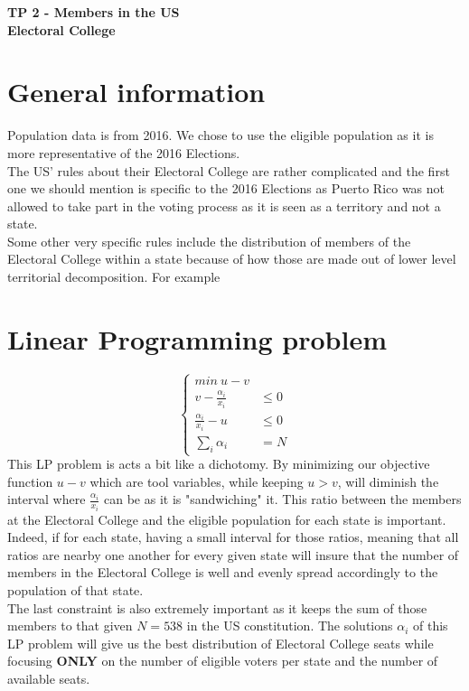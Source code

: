 \documentclass[a4paper,10pt,calibri,oneside,openany, twocolumn]{report}
\theoremstyle{break}
\begin{document}
	\begin{center}
		\bfseries TP 2 - Members in the US\\ Electoral College
	\end{center}
\section*{General information}
Population data is from 2016. We chose to use the eligible population as it is more representative of the 2016 Elections.\\

The US' rules about their Electoral College are rather complicated and the first one we should mention is specific to the 2016 Elections as Puerto Rico was not allowed to take part in the voting process as it is seen as a territory and not a state.\\

Some other very specific rules include the distribution of members of the Electoral College within a state because of how those are made out of lower level territorial decomposition. For example
\section*{Linear Programming problem}
\begin{equation}
\begin{cases}
min\ u-v& \\
v - \frac{\alpha_i}{x_i}&\leq 0\\
\frac{\alpha_i}{x_i}- u &\leq 0\\
\sum\limits_i \alpha_i &= N
\end{cases}
\end{equation}
This LP problem is acts a bit like a dichotomy. By minimizing our objective function $u-v$ which are tool variables, while keeping $u>v$, will diminish the interval where $\frac{\alpha_i}{x_i}$ can be as it is "sandwiching" it. This ratio between the members at the Electoral College and the eligible population for each state is important. Indeed, if for each state, having a small interval for those ratios, meaning that all ratios are nearby one another for every given state will insure that the number of members in the Electoral College is well and evenly spread accordingly to the population of that state.\\

The last constraint is also extremely important as it keeps the sum of those members to that given $N=538$ in the US constitution. The solutions $\alpha_i$ of this LP problem will give us the best distribution of Electoral College seats while focusing \textbf{ONLY} on the number of eligible voters per state and the number of available seats. \\
\end{document}
